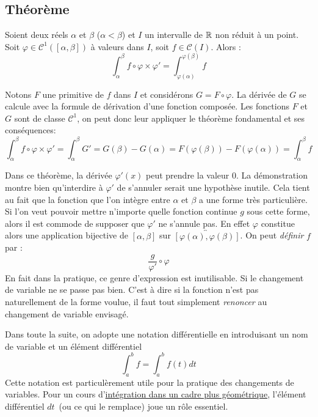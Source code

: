 \subsection{Théorème}
\begin{thm}
 Soient deux réels $\alpha$ et $\beta$ ($\alpha < \beta$) et $I$ un intervalle de $\mathbb{R}$ non réduit à un point. Soit $\varphi\in \mathcal C^1([\alpha,\beta])$ à valeurs dans $I$, soit $f \in \mathcal{C}(I)$. Alors :
\begin{displaymath}
 \int_\alpha ^{\beta}f\circ \varphi \times \varphi' = \int_{\varphi(\alpha)}^{\varphi(\beta)}f
\end{displaymath}
\end{thm}
\begin{demo}
 Notons $F$ une primitive de $f$ dans $I$ et considérons $G=F\circ \varphi$. La dérivée de $G$ se calcule avec la formule de dérivation d'une fonction composée. Les fonctions $F$ et $G$ sont de classe $\mathcal C^1$, on peut donc leur appliquer le théorème fondamental et ses conséquences:
\begin{displaymath}
 \int_{\alpha} ^{\beta} f \circ\varphi \times \varphi' =\int_{\alpha} ^{\beta}G'=G(\beta)-G(\alpha)
=F(\varphi(\beta))-F(\varphi(\alpha))=\int_{\alpha}^{\beta}f
\end{displaymath}
\end{demo}
\begin{rem}
 Dans ce théorème, la dérivée  $\varphi'(x)$ peut prendre la valeur $0$. La démonstration montre bien qu'interdire à $\varphi'$ de s'annuler serait une hypothèse inutile. Cela tient au fait que la fonction que l'on intègre entre $\alpha$ et $\beta$ a une forme très particulière. Si l'on veut pouvoir mettre n'importe quelle fonction continue $g$ sous cette forme, alors il est commode de supposer que $\varphi'$ ne s'annule pas. En effet $\varphi$ constitue alors une application bijective de $[\alpha,\beta]$ sur $\overleftrightarrow{[\varphi(\alpha),\varphi(\beta)]}$. On peut \emph{définir} $f$ par :
\begin{displaymath}
 \frac{g}{\varphi'}\circ \varphi
\end{displaymath}
En fait dans la pratique, ce genre d'expression est inutilisable. Si le changement de variable ne se passe pas bien. C'est à dire si la fonction n'est pas naturellement de la forme voulue, il faut tout simplement \emph{renoncer} au changement de variable envisagé.
\end{rem}
Dans toute la suite, on adopte une notation différentielle en introduisant un nom de variable et un élément différentiel
\begin{displaymath}
 \int_{a}^{b}f = \int_{a}^{b}f(t)dt
\end{displaymath}
Cette notation est particulèrement utile pour la pratique des changements de variables. Pour un cours d'\href{\baseurl C2269.pdf}{intégration dans un cadre plus géométrique}, l'élément différentiel \og $dt$\fg~(ou ce qui le remplace) joue un rôle essentiel.

